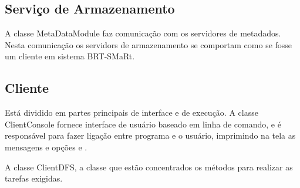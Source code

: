 	
	\subsection{Serviço de Armazenamento}
	
	A classe MetaDataModule faz comunicação com os servidores de metadados. Nesta comunicação os servidors de armazenamento se comportam como se fosse um cliente em sistema BRT-SMaRt.
	
	\subsection{Cliente}
	Está dividido em partes principais de interface e de execução. 
	A classe ClientConsole fornece interface de usuário baseado em linha de comando, e é responsável para fazer ligação entre programa e o usuário, imprimindo na tela as mensagens e opções e .
	
	A classe ClientDFS, a classe que estão concentrados os métodos para realizar as tarefas exigidas.
	
	
	